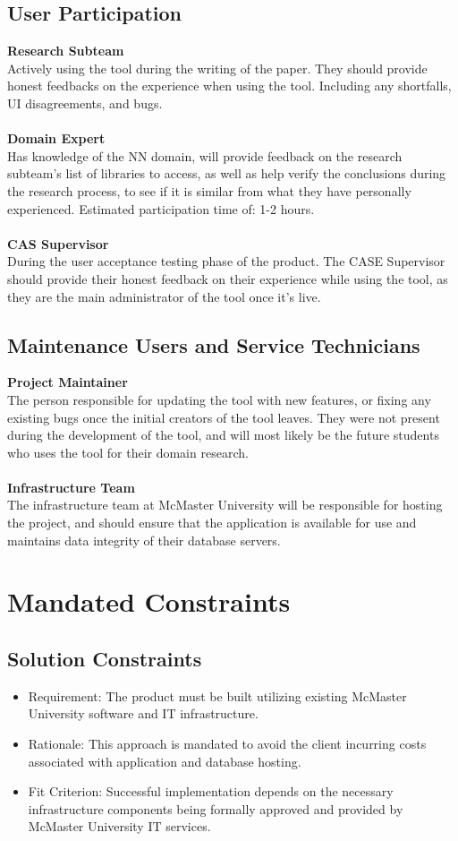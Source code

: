 \documentclass[12pt]{article}
\begin{document}
\subsection{User Participation}
\textbf{Research Subteam} \\
Actively using the tool during the writing of the paper. They should provide honest feedbacks on the experience when using the tool. Including any shortfalls, UI disagreements, and bugs.\\\\
\textbf{Domain Expert} \\
Has knowledge of the NN domain, will provide feedback on the research subteam’s list of libraries to access, as well as help verify the conclusions during the research process, to see if it is similar from what they have personally experienced. Estimated participation time of: 1-2 hours.
\\\\\textbf{CAS Supervisor} \\
During the user acceptance testing phase of the product. The CASE Supervisor should provide their honest feedback on their experience while using the tool, as they are the main administrator of the tool once it's live.

\subsection{Maintenance Users and Service Technicians}
\textbf{Project Maintainer} \\
The person responsible for updating the tool with new features, or fixing any existing bugs once the initial creators of the tool leaves. They were not present during the development of the tool, and will most likely be the future students who uses the tool for their domain research.
\\\\
\textbf{Infrastructure Team} \\
The infrastructure team at McMaster University will be responsible for hosting the project, and should ensure that the application is available for use and maintains data integrity of their database servers.
\section{Mandated Constraints}
\subsection{Solution Constraints}
\begin{itemize}
  \item Requirement: The product must be built utilizing existing McMaster University software and IT infrastructure.
  \item Rationale: This approach is mandated to avoid the client incurring costs associated with application and database hosting.
  \item Fit Criterion: Successful implementation depends on the necessary infrastructure components being formally approved and provided by McMaster University IT services.
\end{itemize}
\end{document}

